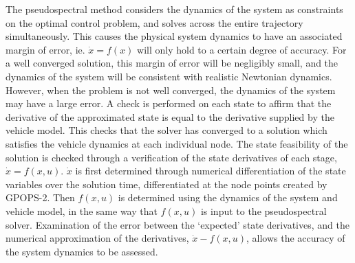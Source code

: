 The pseudospectral method considers the dynamics of the system as constraints on the optimal control problem, and solves across the entire trajectory simultaneously. This causes the physical system dynamics to have an associated margin of error, ie. $\dot{x} = f(x)$ will only hold to a certain degree of accuracy. For a well converged solution, this margin of error will be negligibly small, and the dynamics of the system will be consistent with realistic Newtonian dynamics. However, when the problem is not well converged, the dynamics of the system may have a large error.
A check is performed on each state to affirm that the derivative of the approximated state is equal to the derivative supplied by the vehicle model. This checks that the solver has converged to a solution which satisfies the vehicle dynamics at each individual node. 
The state feasibility of the solution is checked through a verification of the state derivatives of each stage, $\dot{x} = f(x,u)$. $\dot{x}$ is first determined through numerical differentiation of the state variables over the solution time, differentiated at the node points created by GPOPS-2. Then $f(x,u)$ is determined using the dynamics of the system and vehicle model, in the same way that $f(x,u)$ is input to the pseudospectral solver. Examination of the error between the `expected' state derivatives, and the numerical approximation of the derivatives, $\dot{x} - f(x,u)$, allows the accuracy of the system dynamics to be assessed. 



